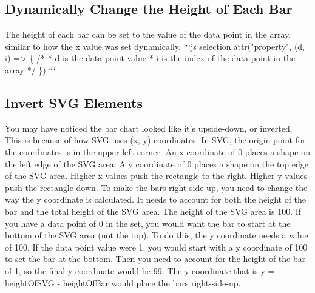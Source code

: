 \documentclass{article}%
\begin{document}
\subsection{Dynamically Change the Height of Each Bar}%
\label{subsec:DynamicallyChangetheHeightofEachBar}%
The height of each bar can be set to the value of the data point in the array, similar to how the x value was set dynamically.\newline%
```js\newline%
selection.attr("property", (d, i) => \{\newline%
  /* \newline%
  * d is the data point value\newline%
  * i is the index of the data point in the array\newline%
  */\newline%
\})\newline%
```\newline%

%
\subsection{Invert SVG Elements}%
\label{subsec:InvertSVGElements}%
You may have noticed the bar chart looked like it's upside{-}down, or inverted. This is because of how SVG uses (x, y) coordinates.\newline%
In SVG, the origin point for the coordinates is in the upper{-}left corner. An x coordinate of 0 places a shape on the left edge of the SVG area. A y coordinate of 0 places a shape on the top edge of the SVG area. Higher x values push the rectangle to the right. Higher y values push the rectangle down.\newline%
To make the bars right{-}side{-}up, you need to change the way the y coordinate is calculated. It needs to account for both the height of the bar and the total height of the SVG area.\newline%
The height of the SVG area is 100. If you have a data point of 0 in the set, you would want the bar to start at the bottom of the SVG area (not the top). To do this, the y coordinate needs a value of 100. If the data point value were 1, you would start with a y coordinate of 100 to set the bar at the bottom. Then you need to account for the height of the bar of 1, so the final y coordinate would be 99.\newline%
The y coordinate that is y = heightOfSVG {-} heightOfBar would place the bars right{-}side{-}up.\newline%
\end{document}
